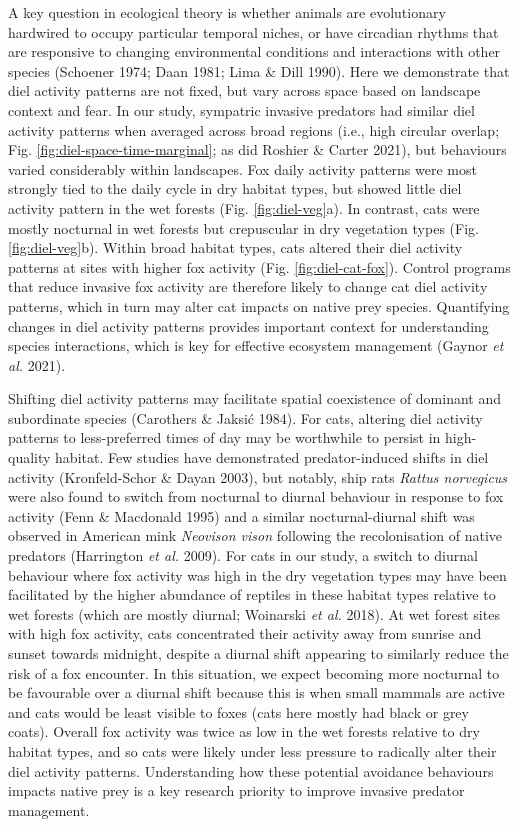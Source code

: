 \documentclass[]{elsarticle} %
\begin{document}
A key question in ecological theory is whether animals are evolutionary hardwired to occupy particular temporal niches, or have circadian rhythms that are responsive to changing environmental conditions and interactions with other species (Schoener 1974; Daan 1981; Lima \& Dill 1990). Here we demonstrate that diel activity patterns are not fixed, but vary across space based on landscape context and fear. In our study, sympatric invasive predators had similar diel activity patterns when averaged across broad regions (i.e., high circular overlap; Fig. \ref{fig:diel-space-time-marginal}; as did Roshier \& Carter 2021), but behaviours varied considerably within landscapes. Fox daily activity patterns were most strongly tied to the daily cycle in dry habitat types, but showed little diel activity pattern in the wet forests (Fig. \ref{fig:diel-veg}a). In contrast, cats were mostly nocturnal in wet forests but crepuscular in dry vegetation types (Fig. \ref{fig:diel-veg}b). Within broad habitat types, cats altered their diel activity patterns at sites with higher fox activity (Fig. \ref{fig:diel-cat-fox}). Control programs that reduce invasive fox activity are therefore likely to change cat diel activity patterns, which in turn may alter cat impacts on native prey species. Quantifying changes in diel activity patterns provides important context for understanding species interactions, which is key for effective ecosystem management (Gaynor \emph{et al.} 2021).

Shifting diel activity patterns may facilitate spatial coexistence of dominant and subordinate species (Carothers \& Jaksić 1984). For cats, altering diel activity patterns to less-preferred times of day may be worthwhile to persist in high-quality habitat. Few studies have demonstrated predator-induced shifts in diel activity (Kronfeld-Schor \& Dayan 2003), but notably, ship rats \emph{Rattus norvegicus} were also found to switch from nocturnal to diurnal behaviour in response to fox activity (Fenn \& Macdonald 1995) and a similar nocturnal-diurnal shift was observed in American mink \emph{Neovison vison} following the recolonisation of native predators (Harrington \emph{et al.} 2009). For cats in our study, a switch to diurnal behaviour where fox activity was high in the dry vegetation types may have been facilitated by the higher abundance of reptiles in these habitat types relative to wet forests (which are mostly diurnal; Woinarski \emph{et al.} 2018). At wet forest sites with high fox activity, cats concentrated their activity away from sunrise and sunset towards midnight, despite a diurnal shift appearing to similarly reduce the risk of a fox encounter. In this situation, we expect becoming more nocturnal to be favourable over a diurnal shift because this is when small mammals are active and cats would be least visible to foxes (cats here mostly had black or grey coats). Overall fox activity was twice as low in the wet forests relative to dry habitat types, and so cats were likely under less pressure to radically alter their diel activity patterns. Understanding how these potential avoidance behaviours impacts native prey is a key research priority to improve invasive predator management.
\end{document}
